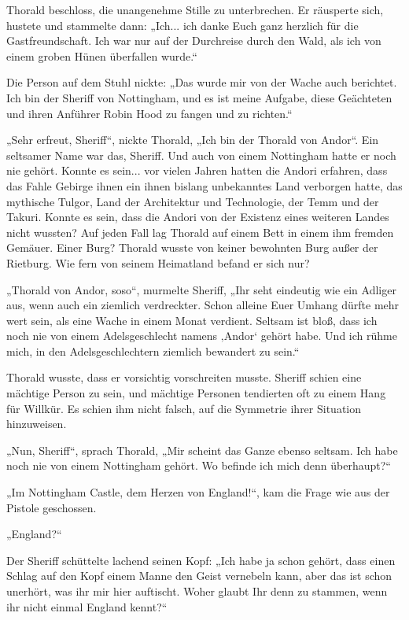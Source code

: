 Thorald beschloss, die unangenehme Stille zu unterbrechen. Er räusperte sich, hustete und stammelte dann: „Ich... ich danke Euch ganz herzlich für die Gastfreundschaft. Ich war nur auf der Durchreise durch den Wald, als ich von einem groben Hünen überfallen wurde.“

Die Person auf dem Stuhl nickte: „Das wurde mir von der Wache auch berichtet. Ich bin der Sheriff von Nottingham, und es ist meine Aufgabe, diese Geächteten und ihren Anführer Robin Hood zu fangen und zu richten.“

„Sehr erfreut, Sheriff“, nickte Thorald, „Ich bin der Thorald von Andor“. Ein seltsamer Name war das, Sheriff. Und auch von einem Nottingham hatte er noch nie gehört. Konnte es sein... vor vielen Jahren hatten die Andori erfahren, dass das Fahle Gebirge ihnen ein ihnen bislang unbekanntes Land verborgen hatte, das mythische Tulgor, Land der Architektur und Technologie, der Temm und der Takuri. Konnte es sein, dass die Andori von der Existenz eines weiteren Landes nicht wussten? Auf jeden Fall lag Thorald auf einem Bett in einem ihm fremden Gemäuer. Einer Burg? Thorald wusste von keiner bewohnten Burg außer der Rietburg. Wie fern von seinem Heimatland befand er sich nur?

„Thorald von Andor, soso“, murmelte Sheriff, „Ihr seht eindeutig wie ein Adliger aus, wenn auch ein ziemlich verdreckter. Schon alleine Euer Umhang dürfte mehr wert sein, als eine Wache in einem Monat verdient. Seltsam ist bloß, dass ich noch nie von einem Adelsgeschlecht namens ‚Andor‘ gehört habe. Und ich rühme mich, in den Adelsgeschlechtern ziemlich bewandert zu sein.“

Thorald wusste, dass er vorsichtig vorschreiten musste. Sheriff schien eine mächtige Person zu sein, und mächtige Personen tendierten oft zu einem Hang für Willkür. Es schien ihm nicht falsch, auf die Symmetrie ihrer Situation hinzuweisen.

„Nun, Sheriff“, sprach Thorald, „Mir scheint das Ganze ebenso seltsam. Ich habe noch nie von einem Nottingham gehört. Wo befinde ich mich denn überhaupt?“

„Im Nottingham Castle, dem Herzen von England!“, kam die Frage wie aus der Pistole geschossen.

„England?“

Der Sheriff schüttelte lachend seinen Kopf: „Ich habe ja schon gehört, dass einen Schlag auf den Kopf einem Manne den Geist vernebeln kann, aber das ist schon unerhört, was ihr mir hier auftischt. Woher glaubt Ihr denn zu stammen, wenn ihr nicht einmal England kennt?“

